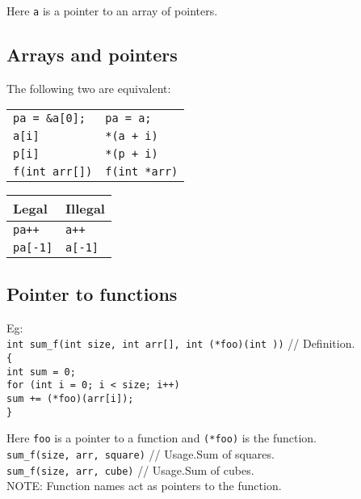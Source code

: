 Here \texttt{a} is a pointer to an array of pointers. 

\subsection{Arrays and pointers}
The following two are equivalent:\\

\begin{tabular}{l|l}
\hline
\texttt{pa = \&a[0];} & \texttt{pa = a;}\\
\texttt{a[i]} & \texttt{*(a + i)}\\
\texttt{p[i]} & \texttt{*(p + i)}\\
\texttt{f(int arr[])} & \texttt{f(int *arr)}\\
\hline
\end{tabular}

\begin{tabular}{l|l}
\hline
Legal & Illegal\\
\hline
\texttt{pa++} & \texttt{a++}\\
\texttt{pa[-1]} & \texttt{a[-1]}\\
\hline
\end{tabular}

\subsection{Pointer to functions}



Eg: \\
\texttt{int sum\_f(int size, int arr[], int (*foo)(int ))} // Definition.\\
\texttt{\{}\\
\qquad \texttt{int sum = 0;}\\
\qquad \texttt{for (int i = 0; i < size; i++)}\\
\qquad \qquad \texttt{sum += (*foo)(arr[i]);}\\
\texttt{\}}

Here \texttt{foo} is a pointer to a function and \texttt{(*foo)} is the function.\\

\texttt{sum\_f(size, arr, square)} // Usage.Sum of squares.\\
\texttt{sum\_f(size, arr, cube)} // Usage.Sum of cubes.\\

NOTE: Function names act as pointers to the function. \\


\vfill \null
\columnbreak

